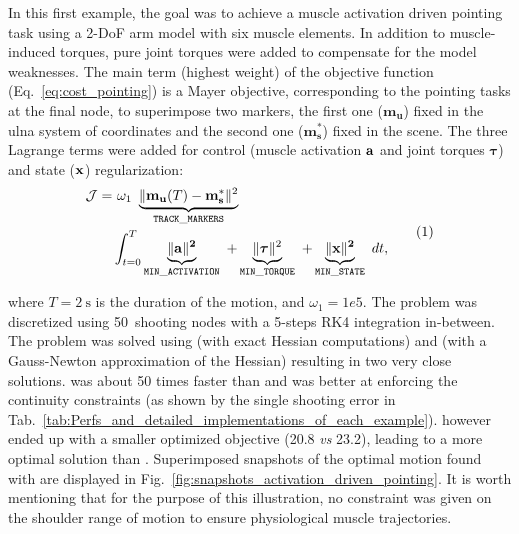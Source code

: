 %
In this first example, the goal was to achieve a muscle activation driven pointing task using a 2-DoF arm model with six muscle elements. 
In addition to muscle-induced torques, pure joint torques were added to compensate for the model weaknesses.
The main term (highest weight) of the objective function (Eq.~\ref{eq:cost_pointing}) is a Mayer objective, corresponding to the pointing tasks at the final node, to superimpose two markers, the first one ($\mathbf{m_u}$) fixed in the ulna system of coordinates and the second one ($\mathbf{m^*_s}$) fixed in the scene.
The three Lagrange terms  were added for control (muscle activation $\bf{a}$ and joint torques $\boldsymbol{\tau}$) and state ($\bf{x}$) regularization:
\[
\begin{aligned}
	\mathcal{J} = 	&~\omega_1~\underbrace{\|\mathbf{m_u}(T)-\mathbf{m^*_s}\|^2}_{\mathtt{TRACK\_MARKERS}}~\\
	&\int_{t=0}^T\underbrace{\|\bf{a}\|^2}_{\mathtt{MIN\_ACTIVATION}}~
	+\underbrace{\|\boldsymbol\tau\|^2}_{\mathtt{MIN\_TORQUE}}~
	+\underbrace{\|\bf{x}\|^2}_{\mathtt{MIN\_STATE}}~ dt,
\end{aligned}
\addtag
\label{eq:cost_pointing}
\]

\noindent where $T\!=\!\SI{2}{\second}$ is the duration of the motion, and $\omega_1\!=\!1e5$.
The problem was discretized using 50~shooting nodes with a 5-steps RK4 integration in-between.
The problem was solved using \ipopt (with exact Hessian computations) and \acados (with a Gauss-Newton approximation of the Hessian) resulting in two very close solutions.
\acados was about 50 times faster than \ipopt and was better at enforcing the continuity constraints (as shown by the single shooting error in Tab.~\ref{tab:Perfs_and_detailed_implementations_of_each_example}).
\ipopt however ended up with a smaller optimized objective (20.8 \textit{vs} 23.2), leading to a more optimal solution than \acados. 
Superimposed snapshots of the optimal motion found with \acados are displayed in Fig.~\ref{fig:snapshots_activation_driven_pointing}.
It is worth mentioning that for the purpose of this illustration, no constraint was given on the shoulder range of motion to ensure physiological muscle trajectories. 








